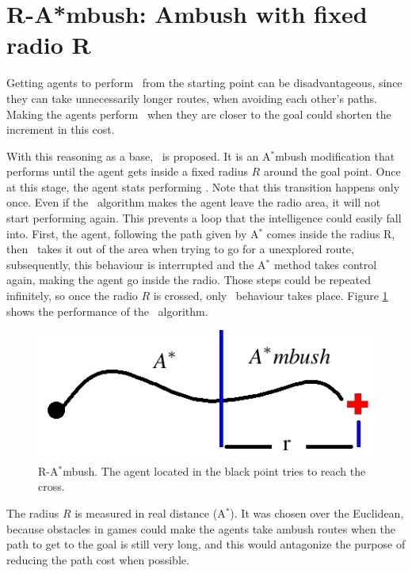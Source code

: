 \section{ R-A*mbush: Ambush with fixed radio R}

Getting agents to perform \ambush\ from the starting 
point can be disadvantageous, since they can take 
unnecessarily longer routes, when avoiding each other’s paths. 
Making the agents perform \ambush\ when they are closer
 to the goal could shorten the increment in this cost. 
 
With this reasoning as a base, \rambush\ is proposed.
 It is an A$^*$mbush modification that performs \astar until
the agent gets inside a fixed radius $R$ around the goal point.
Once at this stage, the agent stats performing \ambush. 
Note that this transition happens only once. Even if  the
\ambush\ algorithm makes the agent leave the radio area,
it will not start performing \astar again. This prevents a 
loop that the intelligence could easily fall into. First, the agent,
following the path given by A$^*$ comes inside the radius R,
then \ambush\ takes it out of the area when trying to go for 
a unexplored route, subsequently, this behaviour is interrupted 
and the A$^*$ method takes control again, making the agent go 
inside the radio. Those steps could be repeated infinitely, 
so once the radio $R$ is crossed, only \ambush\ behaviour takes place.
Figure \ref{fig:rambush} shows the performance of the \rambush\
algorithm.

\begin{figure}[htb]
	\centerline{
		\includegraphics[width=0.48\columnwidth]{figures/rambush.jpg}
	}
	\caption{\label{fig:rambush}
	     R-A$^*$mbush. The agent located in the black point
	     tries to reach the cross.}
\end{figure}

The radius $R$ is measured in real distance (A$^*$). 
It was chosen over the Euclidean, because obstacles in games 
could make the agents take ambush routes when the path to 
get to the goal is still very long, and this would antagonize 
the purpose of reducing the path cost when possible.
